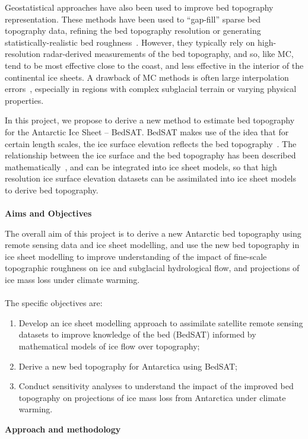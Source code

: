 \documentclass[10pt,a4paper]{article}
\begin{document}
Geostatistical approaches have also been used to improve bed topography representation.
These methods have been used to “gap-fill” sparse bed topography data, refining the bed topography resolution or generating statistically-realistic bed roughness~\cite{GreenlandGeostatistics}. However, they typically rely on high-resolution radar-derived measurements of the bed topography, and so, like MC, tend to be most effective close to the coast, and less effective in the interior of the continental ice sheets. A drawback of MC methods is often large interpolation errors~\cite{ATR}, especially in regions with complex subglacial terrain or varying physical properties.

In this project, we propose to derive a new method to estimate bed topography for the Antarctic Ice Sheet – BedSAT. BedSAT makes use of the idea that for certain length scales, the ice surface elevation reflects the bed topography~\cite{SurfaceOndulations}. The relationship between the ice surface and the bed topography has been described mathematically~\cite{Budd_1970}, and can be integrated into ice sheet models, so that high resolution ice surface elevation datasets can be assimilated into ice sheet models to derive bed topography.\\
\\\textbf{Aims and Objectives}

The overall aim of this project is to derive a new Antarctic bed topography using remote sensing data and ice sheet modelling, and use the new bed topography in ice sheet modelling to improve understanding of the impact of fine-scale topographic roughness on ice and subglacial hydrological flow, and projections of ice mass loss under climate warming.\\
\\The specific objectives are:
\begin{enumerate}
    \item Develop an ice sheet modelling approach to assimilate satellite remote sensing datasets to improve knowledge of the bed (BedSAT) informed by mathematical models of ice flow over topography;
    \item Derive a new bed topography for Antarctica using BedSAT;
    \item Conduct sensitivity analyses to understand the impact of the improved bed topography on projections of ice mass loss from Antarctica under climate warming.
\end{enumerate}
\textbf{Approach and methodology}
\end{document}
